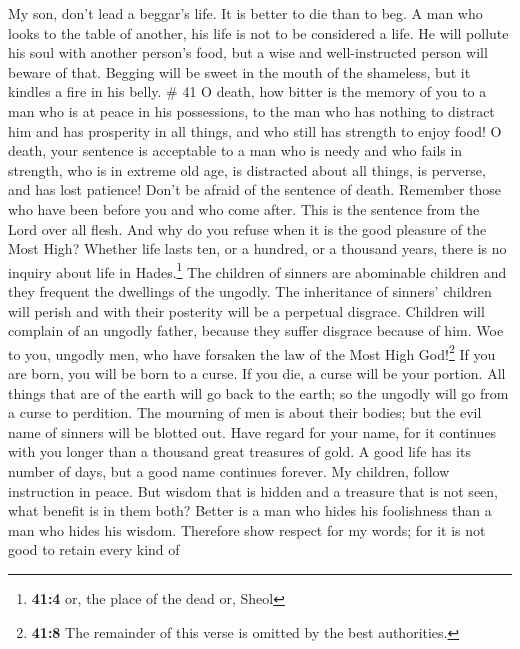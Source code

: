 My son, don't lead a beggar's life. It is better to die than to beg.
 A man who looks to the table of another, his life is not
to be considered a life. He will pollute his soul with another person's
food, but a wise and well-instructed person will beware of that.
 Begging will be sweet in the mouth of the shameless, but
it kindles a fire in his belly. \# 41  O death, how bitter
is the memory of you to a man who is at peace in his possessions, to the
man who has nothing to distract him and has prosperity in all things,
and who still has strength to enjoy food!  O death, your
sentence is acceptable to a man who is needy and who fails in strength,
who is in extreme old age, is distracted about all things, is perverse,
and has lost patience!  Don't be afraid of the sentence of
death. Remember those who have been before you and who come after. This
is the sentence from the Lord over all flesh.  And why do
you refuse when it is the good pleasure of the Most High? Whether life
lasts ten, or a hundred, or a thousand years, there is no inquiry about
life in Hades.\footnote{\textbf{41:4} or, the place of the dead or,
  Sheol}  The children of sinners are abominable children
and they frequent the dwellings of the ungodly.  The
inheritance of sinners' children will perish and with their posterity
will be a perpetual disgrace.  Children will complain of
an ungodly father, because they suffer disgrace because of him.
 Woe to you, ungodly men, who have forsaken the law of the
Most High God!\footnote{\textbf{41:8} The remainder of this verse is
  omitted by the best authorities.}  If you are born, you
will be born to a curse. If you die, a curse will be your portion.
 All things that are of the earth will go back to the
earth; so the ungodly will go from a curse to perdition. 
The mourning of men is about their bodies; but the evil name of sinners
will be blotted out.  Have regard for your name, for it
continues with you longer than a thousand great treasures of gold.
 A good life has its number of days, but a good name
continues forever.  My children, follow instruction in
peace. But wisdom that is hidden and a treasure that is not seen, what
benefit is in them both?  Better is a man who hides his
foolishness than a man who hides his wisdom.  Therefore
show respect for my words; for it is not good to retain every kind of
